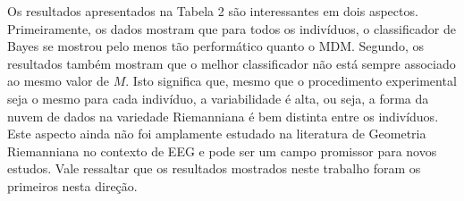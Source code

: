 \documentclass[a4paper,titlepage]{article}
\begin{document}
\begin{center}
  \vspace{1em}
  \vspace{1em}
\end{center}

Os resultados apresentados na Tabela 2 são interessantes em dois aspectos.
Primeiramente, os dados mostram que para todos os indivíduos, o classificador de
Bayes se mostrou pelo menos tão performático quanto o MDM\@. Segundo, os
resultados também mostram que o melhor classificador não está sempre associado
ao mesmo valor de $M$. Isto significa que, mesmo que o procedimento experimental
seja o mesmo para cada indivíduo, a variabilidade é alta, ou seja, a forma da
nuvem de dados na variedade Riemanniana é bem distinta entre os indivíduos.
Este aspecto ainda não foi amplamente estudado na literatura de Geometria
Riemanniana no contexto de EEG e pode ser um campo promissor para novos
estudos. Vale ressaltar que os resultados mostrados neste trabalho foram os
primeiros nesta direção.

\begin{center}
  \vspace{1em}
  \vspace{1em}
\end{center}
\end{document}

